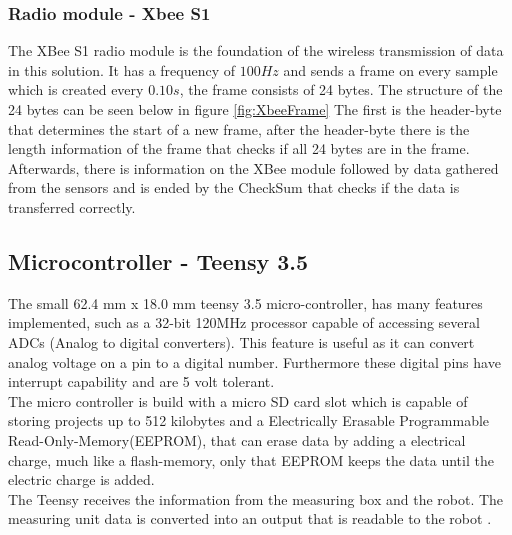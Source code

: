 \subsubsection*{Radio module - Xbee S1}\label{XbeeExplan}
The XBee S1 radio module is the foundation of the wireless transmission of data in this solution. It has a frequency of $100Hz$ and sends a frame on every sample which is created every $0.10s$, the frame consists of 24 bytes. The structure of the 24 bytes can be seen below in figure \ref{fig:XbeeFrame}
\label{XbeeDataStruct}
The first is the header-byte that determines the start of a new frame, after the header-byte there is the length information of the frame that checks if all 24 bytes are in the frame. Afterwards, there is information on the XBee module followed by data gathered from the sensors and is ended by the CheckSum that checks if the data is transferred correctly.
\subsection*{Microcontroller - Teensy 3.5}
The small 62.4 mm x 18.0 mm teensy 3.5 micro-controller, has many features implemented, such as a 32-bit 120MHz processor capable of accessing several ADCs (Analog to digital converters). This feature is useful as it can convert analog voltage on a pin to a digital number. Furthermore these digital pins have interrupt capability and are 5 volt tolerant.\\
The micro controller is build with a micro SD card slot which is capable of storing projects up to 512 kilobytes and a Electrically Erasable Programmable Read-Only-Memory(EEPROM), that can erase data by adding a electrical charge, much like a flash-memory, only that EEPROM keeps the data until the electric charge is added.\\
The Teensy receives the information from the measuring box and the robot. The measuring unit data is converted into an output that is readable to the robot \cite{Teensy1}.



